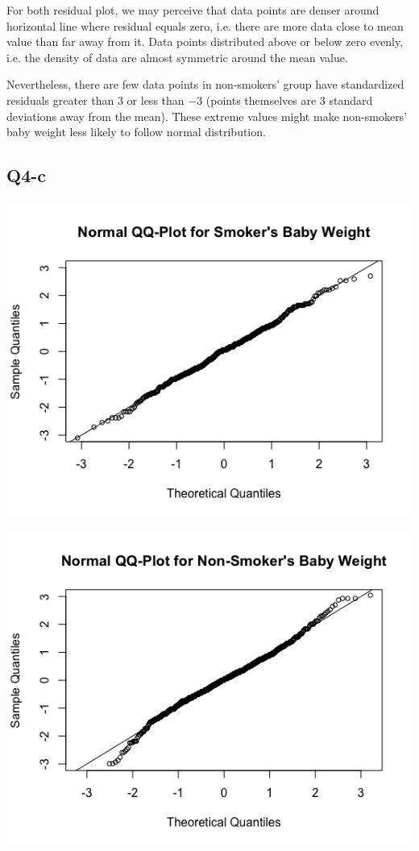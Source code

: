 \documentclass[11pt,letterpaper]{article}
\begin{document}
\noindent For both residual plot, we may perceive that data points are denser around horizontal line where residual equals zero, i.e. there are more data close to mean value than far away from it. Data points distributed above or below zero evenly, i.e. the density of data are almost symmetric around the mean value. 

\noindent Nevertheless, there are few data points in non-smokers' group have standardized residuals greater than $3$ or less than $-3$ (points themselves are 3 standard deviations away from the mean). These extreme values might make non-smokers' baby weight less likely to follow normal distribution.

\newpage
\subsection*{Q4-c}

\includegraphics[scale=0.6]{q4-c-smoke.png}

\includegraphics[scale=0.6]{q4-c-nonsmoke.png}
\end{document}
